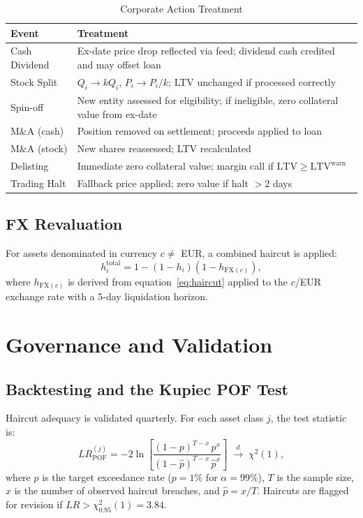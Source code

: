 \documentclass[12pt, a4paper]{article}
\newcommand{\LTV}{\mathrm{LTV}}
\newcommand{\1}{\mathbbm{1}}
\begin{document}
\begin{table}[H]
\centering
\caption{Corporate Action Treatment}
\begin{tabular}{p{3.5cm}p{9cm}}
\toprule
\textbf{Event} & \textbf{Treatment} \\
\midrule
Cash Dividend      & Ex-date price drop reflected via feed; dividend cash credited and may offset loan \\
Stock Split        & $Q_i \to k Q_i$, $P_i \to P_i/k$; LTV unchanged if processed correctly \\
Spin-off           & New entity assessed for eligibility; if ineligible, zero collateral value from ex-date \\
M\&A (cash)        & Position removed on settlement; proceeds applied to loan \\
M\&A (stock)       & New shares reassessed; LTV recalculated \\
Delisting          & Immediate zero collateral value; margin call if $\LTV \geq \LTV^{\mathrm{warn}}$ \\
Trading Halt       & Fallback price applied; zero value if halt $> 2$ days \\
\bottomrule
\end{tabular}
\end{table}

\subsection{FX Revaluation}
For assets denominated in currency $c \neq$ EUR, a combined haircut is applied:
\[
h_i^{\mathrm{total}} = 1 - (1-h_i)(1-h_{\mathrm{FX}(c)}),
\]
where $h_{\mathrm{FX}(c)}$ is derived from equation~\eqref{eq:haircut} applied
to the $c$/EUR exchange rate with a 5-day liquidation horizon.

\section{Governance and Validation}
\label{sec:governance}

\subsection{Backtesting and the Kupiec POF Test}

Haircut adequacy is validated quarterly. For each asset class $j$, the test
statistic is:
\begin{equation}
    LR_{\mathrm{POF}}^{(j)}
    = -2\ln\!\left[
        \frac{(1-p)^{T-x}\,p^x}{(1-\hat{p})^{T-x}\,\hat{p}^x}
    \right] \;\xrightarrow{d}\; \chi^2(1),
    \label{eq:kupiec}
\end{equation}
where $p$ is the target exceedance rate ($p = 1\%$ for $\alpha = 99\%$),
$T$ is the sample size, $x$ is the number of observed haircut breaches, and
$\hat{p} = x/T$. Haircuts are flagged for revision if $LR > \chi^2_{0.95}(1) = 3.84$.
\end{document}
